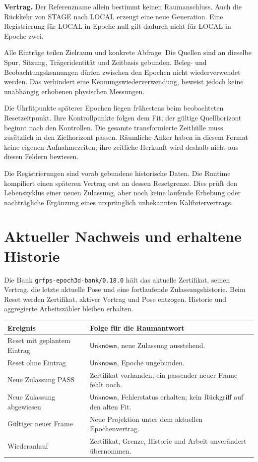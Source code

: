 \documentclass[11pt,a4paper]{article}
\newcommand{\Unknown}{\ensuremath{\mathsf{Unknown}}}
\newcommand{\contract}[1]{\vspace{3pt}\noindent\colorbox{pale}{\parbox{\dimexpr\linewidth-2\fboxsep}{\textbf{Vertrag.} #1}}\vspace{5pt}}
\newcommand{\nextsection}[2]{\clearpage{\color{accent}\small\textsf{#1}}\section{#2}}
\begin{document}
\contract{Der Referenzname allein bestimmt keinen Raumanschluss.
Auch die Rückkehr von STAGE nach LOCAL erzeugt eine neue Generation.
Eine Registrierung für LOCAL in Epoche null gilt dadurch nicht
für LOCAL in Epoche zwei.}

Alle Einträge teilen Zielraum und konkrete Abfrage. Die Quellen
sind an dieselbe Spur, Sitzung, Trägeridentität und Zeitbasis
gebunden. Beleg- und Beobachtungskennungen dürfen zwischen den
Epochen nicht wiederverwendet werden. Das verhindert eine
Kennungswiederverwendung, beweist jedoch keine unabhängig
erhobenen physischen Messungen.

Die Uhrfitpunkte späterer Epochen liegen frühestens beim
beobachteten Resetzeitpunkt. Ihre Kontrollpunkte folgen dem Fit;
der gültige Quellhorizont beginnt nach den Kontrollen. Die gesamte
transformierte Zeithülle muss zusätzlich in den Zielhorizont passen.
Räumliche Anker haben in diesem Format keine eigenen Aufnahmezeiten;
ihre zeitliche Herkunft wird deshalb nicht aus diesen Feldern bewiesen.

Die Registrierungen sind vorab gebundene historische Daten.
Die Runtime kompiliert einen späteren Vertrag erst an dessen
Resetgrenze. Dies prüft den Lebenszyklus einer neuen Zulassung,
aber noch keine laufende Erhebung oder nachträgliche Ergänzung
eines ursprünglich unbekannten Kalibriervertrags.

\nextsection{110 / ZULASSUNG UND WIEDERANLAUF}{Aktueller Nachweis und erhaltene Historie}
Die Bank \texttt{grfps-epoch3d-bank/0.18.0} hält das aktuelle
Zertifikat, seinen Vertrag, die letzte aktuelle Pose und eine
fortlaufende Zulassungshistorie. Beim Reset werden Zertifikat,
aktiver Vertrag und Pose entzogen. Historie und aggregierte
Arbeitszähler bleiben erhalten.

\begin{tabularx}{\linewidth}{@{}lY@{}}\toprule
Ereignis & Folge für die Raumantwort\\\midrule
Reset mit geplantem Eintrag & \Unknown, neue Zulassung ausstehend.\\
Reset ohne Eintrag & \Unknown, Epoche ungebunden.\\
Neue Zulassung PASS & Zertifikat vorhanden; ein passender neuer Frame fehlt noch.\\
Neue Zulassung abgewiesen & \Unknown, Fehlerstatus erhalten; kein Rückgriff auf den alten Fit.\\
Gültiger neuer Frame & Neue Projektion unter dem aktuellen Epochenvertrag.\\
Wiederanlauf & Zertifikat, Grenze, Historie und Arbeit unverändert übernommen.\\\bottomrule
\end{tabularx}
\end{document}
